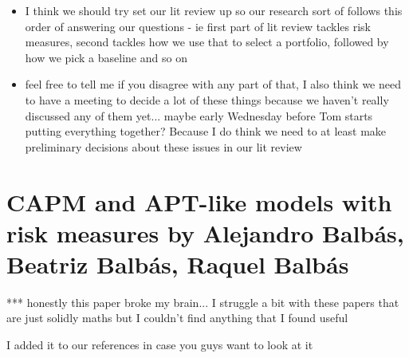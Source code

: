 \documentclass[12pt,a4paper]{article}
\newcommand{\bi}{\begin{itemize}}
\newcommand{\ei}{\end{itemize}}
\begin{document}
\bi
\item I think we should try set our lit review up so our research sort of follows this order of answering our questions - ie first part of lit review tackles risk measures, second tackles how we use that to select a portfolio, followed by how we pick a baseline and so on
\item feel free to tell me if you disagree with any part of that, I also think we need to have a meeting to decide a lot of these things because we haven't really discussed any of them yet... maybe early Wednesday before Tom starts putting everything together? Because I do think we need to at least make preliminary decisions about these issues in our lit review 
\ei
 
\section{CAPM and APT-like models with risk measures by Alejandro Balb{\'a}s, Beatriz Balb{\'a}s, Raquel Balb{\'a}s}
\label{sec:4}

*** honestly this paper broke my brain... I struggle a bit with these papers that are just solidly maths but I couldn't find anything that I found useful

I added it to our references in case you guys want to look at it \cite{BALBAS20101166}



 
 


\newpage


\label{bib:bibliography}
 
\end{document}
